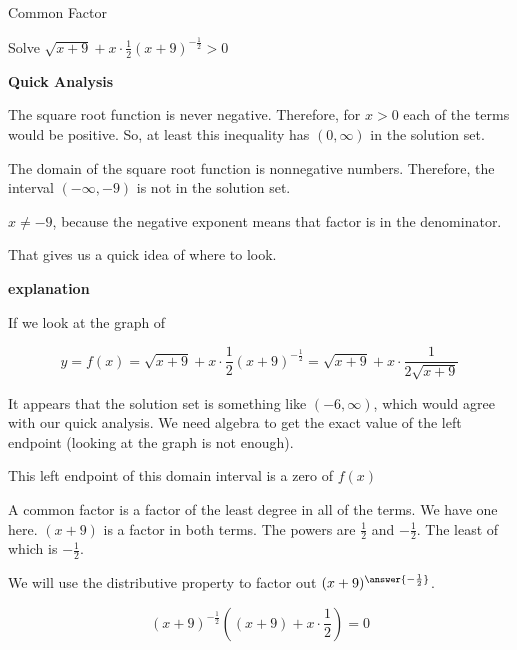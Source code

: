 \documentclass{ximera}
\begin{document}
\begin{example}  Common Factor


Solve $\sqrt{x+9} + x \cdot \frac{1}{2} (x+9)^{-\tfrac{1}{2}} > 0$






\textbf{\textcolor{blue!55!black}{Quick Analysis}} 

The square root function is never negative.  Therefore, for $x > 0$ each of the terms would be positive.  So, at least this inequality has $(0, \infty)$ in the solution set.  


The domain of the square root function is nonnegative numbers.  Therefore, the interval $(-\infty, -9)$ is not in the solution set.   


$x \ne -9$, because the negative exponent means that factor is in the denominator.





That gives us a quick idea of where to look.


\textbf{\textcolor{red!75!green}{explanation}} 





If we look at the graph of  

\[
y = f(x) = \sqrt{x+9} + x \cdot \frac{1}{2} (x+9)^{-\tfrac{1}{2}} = \sqrt{x+9} + x \cdot \frac{1}{2 \sqrt{x+9}} 
\]




\begin{center}
\end{center}




It appears that the solution set is something like  $(-6, \infty)$, which would agree with our quick analysis.  We need algebra to get the exact value of the left endpoint (looking at the graph is not enough).


This left endpoint of this domain interval is a zero of $f(x)$ 






A common factor is a factor of the least degree in all of the terms.  We have one here. $(x+9)$ is a factor in both terms.  The powers are $\frac{1}{2}$ and $-\frac{1}{2}$. The least of which is $-\frac{1}{2}$.

We will use the distributive property to factor out $(x+9)^{\answer{-\frac{1}{2}}}$.


\[ (x+9)^{-\tfrac{1}{2}} \left((x+9) + x \cdot \frac{1}{2}\right)  = 0 \]



\end{example}
\end{document}
